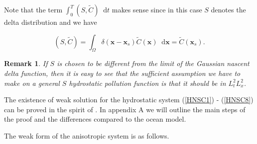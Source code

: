 \documentclass[11pt]{article}
\newtheorem{remark}{Remark}
\newcommand*\diff{\mathop{}\!\mathrm{d}}
\begin{document}
  Note that the term $\int_0^T (S,\tilde{C}) \diff t$ makes sense since in this case $S$ denotes the delta distribution and we have 
  
  \[ (S,\tilde{C}) = \int_\Omega \delta(\mathbf{x} - \mathbf{x}_s) \tilde{C}(\mathbf{x}) \diff \mathbf{x} = \tilde{C}(\mathbf{x}_s).\]
  
  \begin{remark}
  If $S$ is chosen to be different from the limit of the Gaussian nascent delta function, then it is easy to see that the sufficient assumption we have to make on a general $S$ hydrostatic pollution function is that it should be in $L^2_t L^2_x$. 
  \end{remark}
  
  The existence of weak solution for the hydrostatic system (\ref{HNSC1}) - (\ref{HNSC8}) can be proved in the spirit of \cite{temam2005some}. In appendix A we will outline the main steps of the proof and the differences compared to the ocean model.

  The weak form of the anisotropic system is as follows.
  
\end{document}
